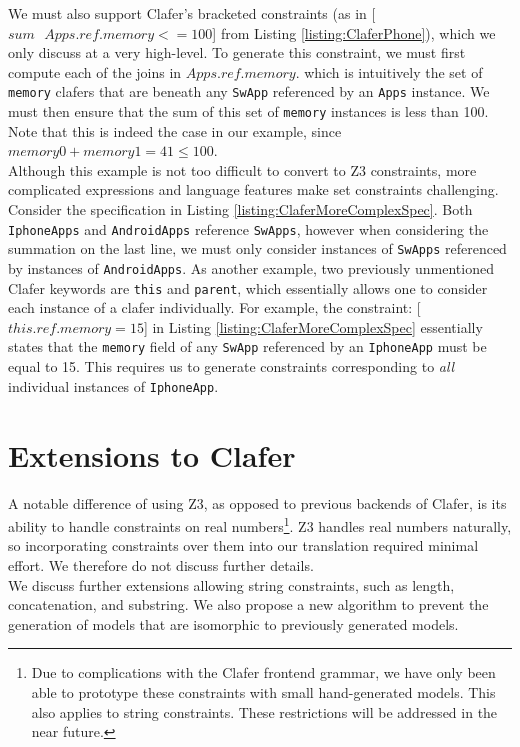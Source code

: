 \documentclass{easychair}
\begin{document}
We must also support Clafer's bracketed constraints (as in [$sum\text{ }Apps.ref.memory <= 100$] from Listing \ref{listing:ClaferPhone}), which we only discuss at a very high-level. To generate this constraint, we must first compute each of the joins in $Apps.ref.memory$. which is intuitively the set of \texttt{memory} clafers that are beneath any \texttt{SwApp} referenced by an \texttt{Apps} instance. We must then ensure that the sum of this set of \texttt{memory} instances is less than 100. Note that this is indeed the case in our example, since $memory0 + memory1 =   41 \le 100$.\\
\indent Although this example is not too difficult to convert to Z3 constraints, more complicated expressions and language features make set constraints challenging. Consider the specification in Listing \ref{listing:ClaferMoreComplexSpec}. Both \texttt{IphoneApps} and \texttt{AndroidApps} reference \texttt{SwApps}, however when considering the summation on the last line, we must only consider instances of \texttt{SwApps} referenced by instances of \texttt{AndroidApps}. As another example, two previously unmentioned Clafer keywords are \texttt{this} and \texttt{parent}, which essentially allows one to consider each instance of a clafer individually. For example, the constraint: [$this.ref.memory = 15$] in Listing \ref{listing:ClaferMoreComplexSpec}  essentially states that the \texttt{memory} field of any \texttt{SwApp} referenced by an \texttt{IphoneApp} must be equal to 15. This requires us to generate constraints corresponding to \textit{all} individual instances of \texttt{IphoneApp}.

\section{Extensions to Clafer}
A notable difference of using Z3, as opposed to previous backends of Clafer, is its ability to handle constraints on real numbers\footnote{Due to complications with the Clafer frontend grammar, we have only been able to prototype these constraints with small hand-generated models. This also applies to string constraints. These restrictions will be addressed in the near future.}. Z3 handles real numbers naturally, so incorporating constraints over them into our translation required minimal effort. We therefore do not discuss further details. \\
\indent We discuss further extensions allowing string constraints, such as length, concatenation, and substring. We also propose a new algorithm to prevent the generation of models that are isomorphic to previously generated models.
\end{document}
